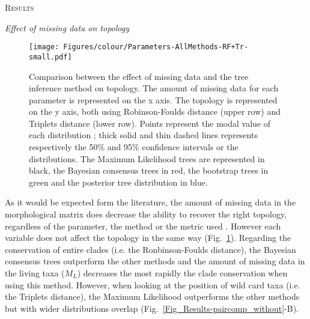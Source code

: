 \documentclass[12pt,letterpaper]{article}
\renewcommand{\section}[1]{%
\bigskip
\begin{center}
\begin{Large}
\normalfont\scshape #1
\medskip
\end{Large}
\end{center}}
\renewcommand{\subsection}[1]{%
\bigskip
\begin{center}
\begin{large}
\normalfont\itshape #1
\end{large}
\end{center}}
\begin{document}
%
%

\section{Results}

\subsection{Effect of missing data on topology}

\begin{figure} 
\centering
    \texttt{[image: Figures/colour/Parameters-AllMethods-RF+Tr-small.pdf]}
\caption{Comparison between the effect of missing data and the tree inference method on topology. The amount of missing data for each parameter is represented on the x axis. The topology is represented on the y axis, both using Robinson-Foulds distance (upper row) and Triplets distance (lower row). Points represent the modal value of each distribution ; thick solid and thin dashed lines represents respectively the 50\% and 95\% confidence intervals or the distributions. The Maximum Likelihood trees are represented in black, the Bayesian consensus trees in red, the bootstrap trees in green and the posterior tree distribution in blue.}
\label{Fig_Results-permeth_perparam} %
\end{figure}

As it would be expected form the literature, the amount of missing data in the morphological matrix does decrease the ability to recover the right topology, regardless of the parameter, the method or the metric used \citep{rouresite-specific2011,sansomfossilization2013,pattinsonphylogeny2014,wrightbayesian2014}. However each variable does not affect the topology in the same way (Fig.~\ref{Fig_Results-permeth_perparam}). Regarding the conservation of entire clades (i.e. the Ronbinson-Foulds distance), the Bayesian consensus trees outperform the other methods and the amount of missing data in the living taxa ($M_{L}$) decreases the most rapidly the clade conservation when using this method. However, when looking at the position of wild card taxa (i.e. the Triplets distance), the Maximum Likelihood outperforms the other methods but with wider distributions overlap (Fig.~\ref{Fig_Results-paircomp_without}-B).
\end{document}
